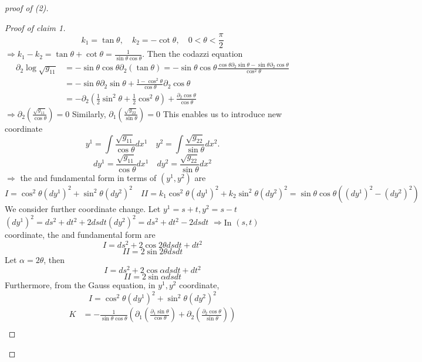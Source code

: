 \begin{proof}[proof of (2)]
\begin{proof}[Proof of claim 1]
    \[
        k_1=\tan\theta,\quad k_2=-\cot\theta,\quad 0<\theta<\frac{\pi}{2}    
    \]
    \(\Rightarrow k_1-k_2=\tan\theta+\cot \theta=
    \frac{1}{\sin\theta\cos\theta}\).
    Then the codazzi equation
    \begin{align*}
        \partial_2\log \sqrt{g_{11}}&=-\sin\theta\cos \theta
        \partial_2(\tan \theta)
        =-\sin\theta\cos\theta \frac{\cos\theta\partial_2\sin\theta
        -\sin\theta\partial_2\cos\theta}{\cos^2\theta}\\
        &=-\sin\theta\partial_2\sin\theta+\frac{1-\cos^2\theta}{\cos\theta}
        \partial_2\cos\theta\\
        &=-\partial_2\left(\frac{1}{2}\sin^2\theta+\frac{1}{2}
        \cos^2\theta\right)+\frac{\partial_2\cos\theta}{\cos\theta}
    \end{align*}
    \(\Rightarrow\partial_2 \left(
        \frac{\sqrt{g_{11}}}{\cos\theta}
    \right)=0\)
    Similarly, \(\partial_1\left(\frac{\sqrt{g_{22}}}{\sin\theta}\right)=0\)
    This enables us to introduce new coordinate
    \[
        y^1=\int    \frac{\sqrt{g_{11}}}{\cos\theta}dx^1\quad
        y^2=\int  \frac{\sqrt{g_{22}}}{\sin\theta} dx^2.
    \]
    \[
        dy^1=    \frac{\sqrt{g_{11}}}{\cos\theta}dx^1\quad
        dy^2= \frac{\sqrt{g_{22}}}{\sin\theta} dx^2
    \]
    \(\Rightarrow\) the  and  fundamental form
    in terms of \((y^1,y^2)\) are 
    \[
        I=\cos^2\theta (dy^1)^2 +\sin^2\theta(dy^2)^2 \quad
        II=k_1\cos^2\theta (dy^1)^2+k_2\sin^2\theta (dy^2)^2  
        =\sin\theta\cos\theta \left((dy^1)^2-(dy^2)^2\right)
    \]
    We consider further coordinate change. Let \(y^1=s+t,y^2=s-t\)
    \(
        (dy^1)^2=ds^2+dt^2+2ds dt
        (dy^2)^2=ds^2+dt^2-2ds dt    
    \)
    \(\Rightarrow \)In \((s,t)\) coordinate, the 
    and  fundamental form are 
    \[
        I=ds^2+2\cos 2\theta ds dt +dt^2    
    \]
    \[
        II=2\sin 2\theta ds dt    
    \]
    Let \(\alpha=2\theta\), then 
    \[
        I=ds^2+2\cos \alpha ds dt +dt^2    
    \]
    \[
        II=2\sin\alpha ds dt    
    \]
    Furthermore, from the Gauss equation, in \(y^1,y^2\) coordinate,
    \[
        I=\cos^2\theta (dy^1)^2 +\sin^2\theta (dy^2)^2   
    \]
    \begin{align*}
        K&=-\frac{1}{\sin\theta \cos\theta }\left(
            \partial_1\left(\frac{\partial_1\sin\theta}{\cos\theta}\right)
            +\partial_2\left(\frac{\partial_2\cos\theta}{\sin\theta}\right)
        \right)\\

\end{align*}
\end{proof}
\end{proof}
